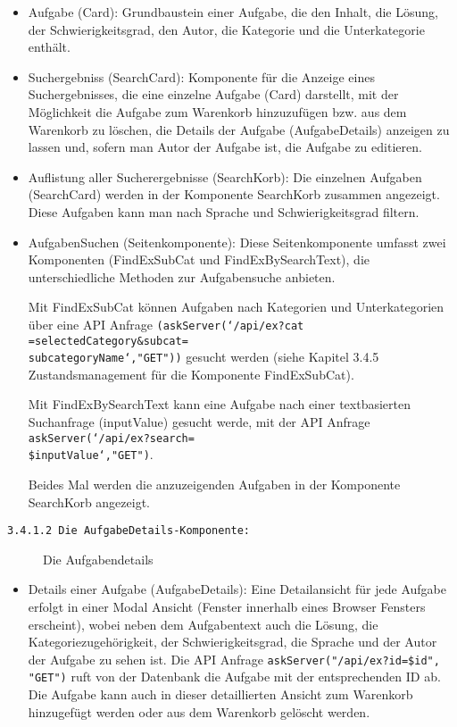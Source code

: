 \begin{itemize}

\item Aufgabe (Card):
Grundbaustein einer Aufgabe, die den Inhalt, die Lösung, der Schwierigkeitsgrad, den Autor, die Kategorie und die Unterkategorie enthält.

\item Suchergebniss (SearchCard):
Komponente für die Anzeige eines Suchergebnisses, die eine einzelne Aufgabe (Card) darstellt, mit der Möglichkeit die Aufgabe zum Warenkorb hinzuzufügen bzw. aus dem Warenkorb zu löschen, die Details der Aufgabe (AufgabeDetails) anzeigen zu lassen und, sofern man Autor der Aufgabe ist, die Aufgabe zu editieren.

\item Auflistung aller Sucherergebnisse (SearchKorb):
Die einzelnen Aufgaben (SearchCard) werden in der Komponente SearchKorb zusammen angezeigt.
Diese Aufgaben kann man nach Sprache und Schwierigkeitsgrad filtern.

\item AufgabenSuchen (Seitenkomponente):
Diese Seitenkomponente umfasst zwei Komponenten (FindExSubCat und FindExBySearchText), die unterschiedliche Methoden zur Aufgabensuche anbieten. 

Mit FindExSubCat können Aufgaben nach Kategorien und Unterkategorien über eine API Anfrage \texttt{(askServer(`/api/ex?cat ={selectedCategory}\&subcat=\\{subcategoryName}`,"GET"))} gesucht werden (siehe Kapitel 3.4.5 Zustandsmanagement für die Komponente FindExSubCat).

Mit FindExBySearchText kann eine Aufgabe nach einer textbasierten Suchanfrage (inputValue) gesucht werde, mit der API Anfrage \texttt{askServer(`/api/ex?search=\\\${inputValue}`,"GET")}.

Beides Mal werden die anzuzeigenden Aufgaben in der Komponente SearchKorb angezeigt.


\end{itemize}

\texttt{3.4.1.2 Die AufgabeDetails-Komponente:}

\begin{figure}[H]
  \caption{Die Aufgabendetails \cite{fig:aufgabendetails}}
\end{figure}

\begin{itemize}
\item Details einer Aufgabe (AufgabeDetails):
Eine Detailansicht für jede Aufgabe erfolgt in einer Modal Ansicht (Fenster innerhalb eines Browser Fensters erscheint), wobei neben dem Aufgabentext auch die Lösung, die Kategoriezugehörigkeit, der Schwierigkeitsgrad, die Sprache und der Autor der Aufgabe zu sehen ist. 
Die API Anfrage \texttt{askServer("/api/ex?id=\${id}", "GET")} ruft von der Datenbank die Aufgabe mit der entsprechenden ID ab.
Die Aufgabe kann auch in dieser detaillierten Ansicht zum Warenkorb hinzugefügt werden oder aus dem Warenkorb gelöscht werden.



\end{itemize}


